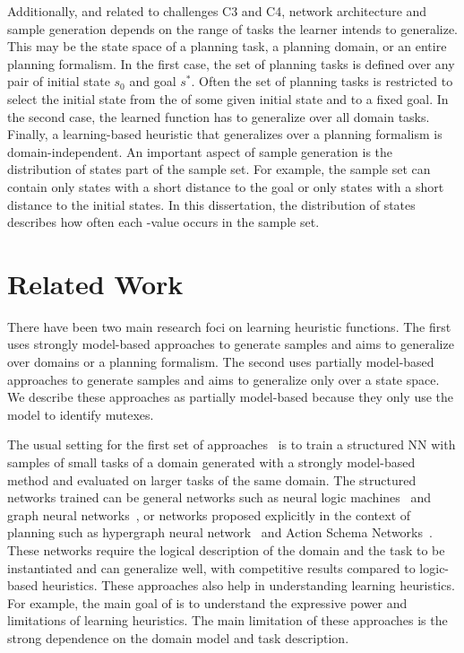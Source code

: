 Additionally, and related to challenges C3 and C4, network architecture and sample generation depends on the range of tasks the learner intends to generalize. This may be the state space of a planning task, a planning domain, or an entire planning formalism. In the first case, the set of planning tasks is defined over any pair of initial state $s_0$ and goal $s^*$. Often the set of planning tasks is restricted to select the initial state from the \fssp of some given initial state and to a fixed goal. In the second case, the learned function has to generalize over all domain tasks. Finally, a learning-based heuristic that generalizes over a planning formalism is domain-independent. An important aspect of sample generation is the distribution of states part of the sample set. For example, the sample set can contain only states with a short distance to the goal or only states with a short distance to the initial states. In this dissertation, the distribution of states describes how often each \hstar-value occurs in the sample set.

\section{Related Work}
\label{sec:background_relatedwork}


There have been two main research foci on learning heuristic functions. The first uses strongly model-based approaches to generate samples and aims to generalize over domains or a planning formalism. The second uses partially model-based approaches to generate samples and aims to generalize only over a state space. We describe these approaches as partially model-based because they only use the model to identify mutexes.

The usual setting for the first set of approaches~\cite{Toyer.etal/2018,Toyer.etal/2020,Shen.etal/2020,Gehring.etal/2022,Stahlberg.etal/2022} is to train a structured NN with samples of small tasks of a domain generated with a strongly model-based method and evaluated on larger tasks of the same domain.  
The structured networks trained can be general networks such as neural logic machines~\cite{Dong.etal/2018} and graph neural networks~\cite{Gori.etal/2005,Scarselli.etal/2008}, or networks proposed explicitly in the context of planning such as hypergraph neural network~\cite{Shen.etal/2020} and Action Schema Networks~\cite{Toyer.etal/2018}.
These networks require the logical description of the domain and the task to be instantiated and can generalize well, with competitive results compared to logic-based heuristics.
These approaches also help in understanding learning heuristics. For example, the main goal of \citeyear{Stahlberg.etal/2022} is to understand the expressive power and limitations of learning heuristics.
The main limitation of these approaches is the strong dependence on the domain model and task description.
  
